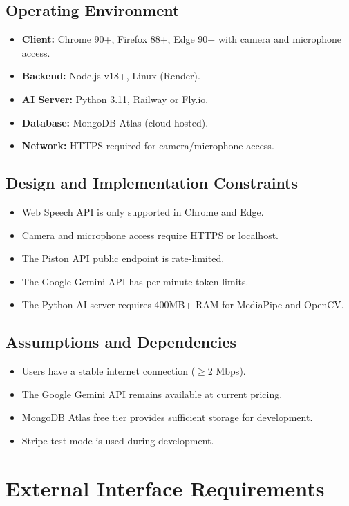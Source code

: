 \subsection*{Operating Environment}
\begin{itemize}
  \item \textbf{Client:} Chrome 90+, Firefox 88+, Edge 90+ with camera and microphone access.
  \item \textbf{Backend:} Node.js v18+, Linux (Render).
  \item \textbf{AI Server:} Python 3.11, Railway or Fly.io.
  \item \textbf{Database:} MongoDB Atlas (cloud-hosted).
  \item \textbf{Network:} HTTPS required for camera/microphone access.
\end{itemize}

\subsection*{Design and Implementation Constraints}
\begin{itemize}
  \item Web Speech API is only supported in Chrome and Edge.
  \item Camera and microphone access require HTTPS or localhost.
  \item The Piston API public endpoint is rate-limited.
  \item The Google Gemini API has per-minute token limits.
  \item The Python AI server requires 400MB+ RAM for MediaPipe and OpenCV.
\end{itemize}

\subsection*{Assumptions and Dependencies}
\begin{itemize}
  \item Users have a stable internet connection ($\geq$2 Mbps).
  \item The Google Gemini API remains available at current pricing.
  \item MongoDB Atlas free tier provides sufficient storage for development.
  \item Stripe test mode is used during development.
\end{itemize}

\section{External Interface Requirements}

